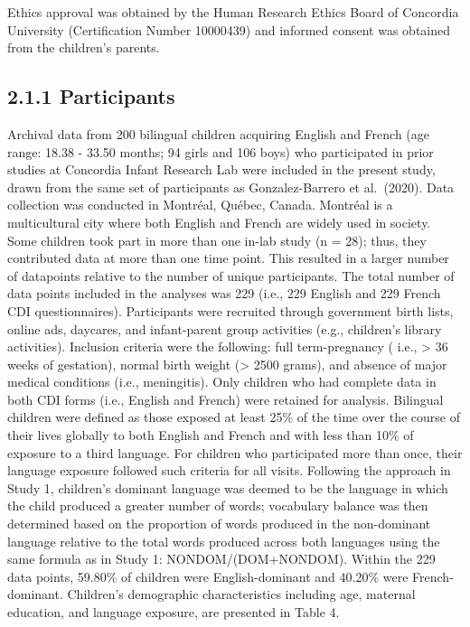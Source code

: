 \documentclass[
  english,
  ,man,floatsintext]{apa6}
\begin{document}
Ethics approval was obtained by the Human Research Ethics Board of Concordia University (Certification Number 10000439) and informed consent was obtained from the children's parents.

\hypertarget{participants}{%
\subsection{2.1.1 Participants}\label{participants}}

Archival data from 200 bilingual children acquiring English and French (age range: 18.38 - 33.50 months; 94 girls and 106 boys) who participated in prior studies at Concordia Infant Research Lab were included in the present study, drawn from the same set of participants as Gonzalez-Barrero et al.~(2020). Data collection was conducted in Montréal, Québec, Canada. Montréal is a multicultural city where both English and French are widely used in society. Some children took part in more than one in-lab study (n = 28); thus, they contributed data at more than one time point. This resulted in a larger number of datapoints relative to the number of unique participants. The total number of data points included in the analyses was 229 (i.e., 229 English and 229 French CDI questionnaires). Participants were recruited through government birth lists, online ads, daycares, and infant-parent group activities (e.g., children's library activities). Inclusion criteria were the following: full term-pregnancy ( i.e., \textgreater{} 36 weeks of gestation), normal birth weight (\textgreater{} 2500 grams), and absence of major medical conditions (i.e., meningitis). Only children who had complete data in both CDI forms (i.e., English and French) were retained for analysis. Bilingual children were defined as those exposed at least 25\% of the time over the course of their lives globally to both English and French and with less than 10\% of exposure to a third language. For children who participated more than once, their language exposure followed such criteria for all visits. Following the approach in Study 1, children's dominant language was deemed to be the language in which the child produced a greater number of words; vocabulary balance was then determined based on the proportion of words produced in the non-dominant language relative to the total words produced across both languages using the same formula as in Study 1: NONDOM/(DOM+NONDOM). Within the 229 data points, 59.80\% of children were English-dominant and 40.20\% were French-dominant. Children's demographic characteristics including age, maternal education, and language exposure, are presented in Table 4.
\end{document}
